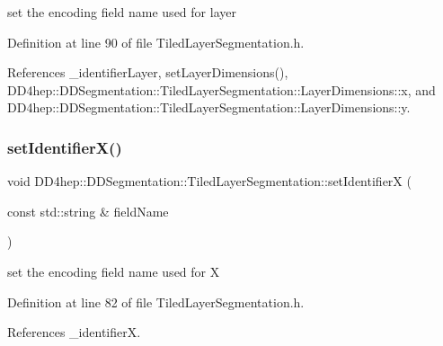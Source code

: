 set the encoding field name used for layer 



Definition at line 90 of file Tiled\+Layer\+Segmentation.\+h.



References \+\_\+identifier\+Layer, set\+Layer\+Dimensions(), D\+D4hep\+::\+D\+D\+Segmentation\+::\+Tiled\+Layer\+Segmentation\+::\+Layer\+Dimensions\+::x, and D\+D4hep\+::\+D\+D\+Segmentation\+::\+Tiled\+Layer\+Segmentation\+::\+Layer\+Dimensions\+::y.

\hypertarget{class_d_d4hep_1_1_d_d_segmentation_1_1_tiled_layer_segmentation_adab12f13ca0d94e18e8d2ef82c8115cb}{}\label{class_d_d4hep_1_1_d_d_segmentation_1_1_tiled_layer_segmentation_adab12f13ca0d94e18e8d2ef82c8115cb} 
\subsubsection{\texorpdfstring{set\+Identifier\+X()}{setIdentifierX()}}
{\footnotesize\ttfamily void D\+D4hep\+::\+D\+D\+Segmentation\+::\+Tiled\+Layer\+Segmentation\+::set\+IdentifierX (\begin{DoxyParamCaption}\item[{const std\+::string \&}]{field\+Name }\end{DoxyParamCaption})\hspace{0.3cm}{\ttfamily [inline]}}



set the encoding field name used for X 



Definition at line 82 of file Tiled\+Layer\+Segmentation.\+h.



References \+\_\+identifierX.

\hypertarget{class_d_d4hep_1_1_d_d_segmentation_1_1_tiled_layer_segmentation_ab9a0cd946f996399d9cabfecc4223abd}{}\label{class_d_d4hep_1_1_d_d_segmentation_1_1_tiled_layer_segmentation_ab9a0cd946f996399d9cabfecc4223abd} 
